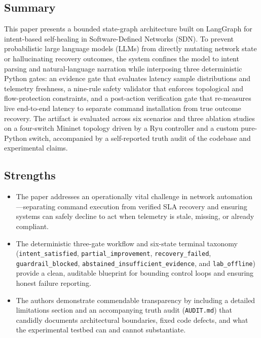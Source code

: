 \documentclass[11pt,a4paper]{article}
\begin{document}
\subsection*{Summary}
This paper presents a bounded state-graph architecture built on LangGraph for intent-based self-healing in Software-Defined Networks (SDN). To prevent probabilistic large language models (LLMs) from directly mutating network state or hallucinating recovery outcomes, the system confines the model to intent parsing and natural-language narration while interposing three deterministic Python gates: an evidence gate that evaluates latency sample distributions and telemetry freshness, a nine-rule safety validator that enforces topological and flow-protection constraints, and a post-action verification gate that re-measures live end-to-end latency to separate command installation from true outcome recovery. The artifact is evaluated across six scenarios and three ablation studies on a four-switch Mininet topology driven by a Ryu controller and a custom pure-Python switch, accompanied by a self-reported truth audit of the codebase and experimental claims.
\subsection*{Strengths}
\begin{itemize}[leftmargin=1.8em,itemsep=2pt]
\item The paper addresses an operationally vital challenge in network automation—separating command execution from verified SLA recovery and ensuring systems can safely decline to act when telemetry is stale, missing, or already compliant.
\item The deterministic three-gate workflow and six-state terminal taxonomy (\texttt{intent\_satisfied}, \texttt{partial\_improvement}, \texttt{recovery\_failed}, \texttt{guardrail\_blocked}, \texttt{abstained\_insufficient\_evidence}, and \texttt{lab\_offline}) provide a clean, auditable blueprint for bounding control loops and ensuring honest failure reporting.
\item The authors demonstrate commendable transparency by including a detailed limitations section and an accompanying truth audit (\texttt{AUDIT.md}) that candidly documents architectural boundaries, fixed code defects, and what the experimental testbed can and cannot substantiate.
\end{itemize}
\end{document}
